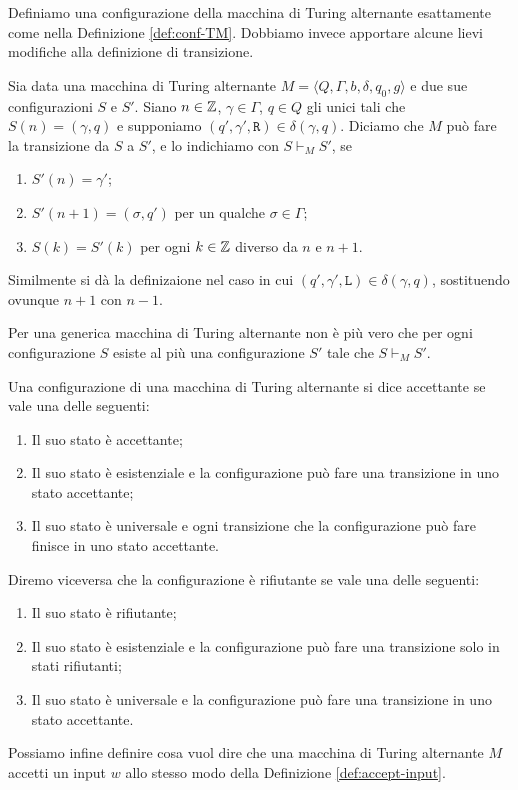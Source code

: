 Definiamo una configurazione della macchina di Turing alternante esattamente
come nella Definizione \ref{def:conf-TM}. Dobbiamo invece apportare alcune lievi
modifiche alla definizione di transizione.
\begin{definizione}
 Sia data una macchina di Turing alternante $M=\langle Q, \Gamma, b, \delta, q_0, g \rangle$
 e due sue configurazioni $S$ e $S'$.
 Siano $n \in \mathbb{Z}$, $\gamma \in \Gamma$, $q \in Q$ gli unici tali che
 $S(n) = (\gamma, q)$ e supponiamo $(q', \gamma', \texttt{R}) \in \delta(\gamma, q)$.
 Diciamo che  $M$ può fare la transizione da $S$ a $S'$, e lo indichiamo con
 $S \vdash_M S'$, se 
 \begin{enumerate}
  \item $S'(n)=\gamma'$;
  \item $S'(n+1)=(\sigma, q')$ per un
 qualche $\sigma \in \Gamma$;
  \item $S(k) = S'(k)$ per ogni $k \in \mathbb{Z}$ diverso da
 $n$ e $n+1$.
 \end{enumerate}
 Similmente si dà la definizaione nel caso in cui
 $(q', \gamma', \texttt{L}) \in \delta(\gamma, q)$,
 sostituendo ovunque $n+1$ con $n-1$.
\end{definizione}

\begin{osservazione}
 Per una generica macchina di Turing alternante non è più vero che per ogni
 configurazione $S$ esiste al più una configurazione $S'$ tale che $S \vdash_M S'$.
\end{osservazione}

\begin{definizione}
 Una configurazione di una macchina di Turing alternante si dice accettante se
 vale una delle seguenti:
 \begin{enumerate}
  \item Il suo stato è accettante;
  \item Il suo stato è esistenziale e la configurazione può fare una transizione
  in uno stato accettante;
  \item Il suo stato è universale e ogni transizione che la configurazione può fare
  finisce in uno stato accettante.
 \end{enumerate}
 Diremo viceversa che la configurazione è rifiutante se vale una delle seguenti:
 \begin{enumerate}
  \item Il suo stato è rifiutante;
  \item Il suo stato è esistenziale e la configurazione può fare una transizione
  solo in stati rifiutanti;
  \item Il suo stato è universale e la configurazione può fare una transizione
  in uno stato accettante.
 \end{enumerate}
\end{definizione}
Possiamo infine definire cosa vuol dire che una macchina di Turing alternante
$M$ accetti un input $w$ allo stesso modo della Definizione \ref{def:accept-input}.

